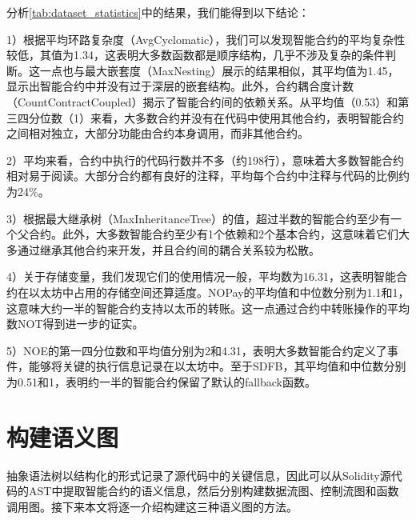 分析\autoref{tab:dataset_statistics}中的结果，我们能得到以下结论：

1）根据平均环路复杂度（AvgCyclomatic），我们可以发现智能合约的平均复杂性较低，其值为1.34，这表明大多数函数都是顺序结构，几乎不涉及复杂的条件判断。这一点也与最大嵌套度（MaxNesting）展示的结果相似，其平均值为1.45，显示出智能合约中并没有过于深层的嵌套结构。此外，合约耦合度计数（CountContractCoupled）揭示了智能合约间的依赖关系。从平均值（0.53）和第三四分位数（1）来看，大多数合约并没有在代码中使用其他合约，表明智能合约之间相对独立，大部分功能由合约本身调用，而非其他合约。

2）平均来看，合约中执行的代码行数并不多（约198行），意味着大多数智能合约相对易于阅读。大部分合约都有良好的注释，平均每个合约中注释与代码的比例约为24\%。

3）根据最大继承树（MaxInheritanceTree）的值，超过半数的智能合约至少有一个父合约。此外，大多数智能合约至少有1个依赖和2个基本合约，这意味着它们大多通过继承其他合约来开发，并且合约间的耦合关系较为松散。

4）关于存储变量，我们发现它们的使用情况一般，平均数为16.31，这表明智能合约在以太坊中占用的存储空间还算适度。NOPay的平均值和中位数分别为1.1和1，这意味大约一半的智能合约支持以太币的转账。这一点通过合约中转账操作的平均数NOT得到进一步的证实。

5）NOE的第一四分位数和平均值分别为2和4.31，表明大多数智能合约定义了事件，能够将关键的执行信息记录在以太坊中。至于SDFB，其平均值和中位数分别为0.51和1，表明约一半的智能合约保留了默认的fallback函数。
\section{构建语义图}
\label{sec:构建语义图}
抽象语法树以结构化的形式记录了源代码中的关键信息，因此可以从Solidity源代码的AST中提取智能合约的语义信息，然后分别构建数据流图、控制流图和函数调用图。接下来本文将逐一介绍构建这三种语义图的方法。

